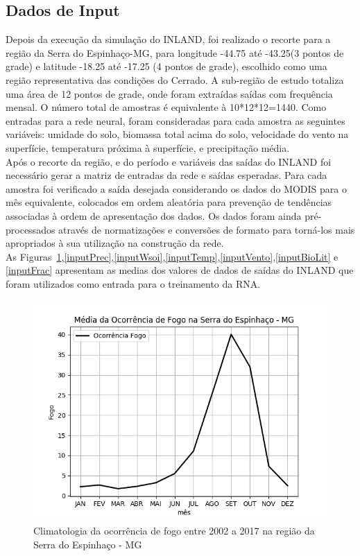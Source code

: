 \documentclass[conference]{IEEEtran}
\begin{document}
\subsection{Dados de Input}
Depois da execução da simulação do INLAND, foi realizado o recorte para a região da Serra do Espinhaço-MG, para longitude -44.75 até -43.25(3 pontos de grade) e latitude -18.25 até -17.25 (4 pontos de grade), escolhido como uma região representativa das condições do Cerrado. A sub-região de estudo totaliza uma área de 12 pontos de grade, onde foram extraídas saídas com frequência mensal. O número total de amostras é equivalente à 10*12*12=1440. Como entradas para a rede neural, foram consideradas para cada amostra as seguintes variáveis: umidade do solo, biomassa total acima do solo, velocidade do vento na superfície, temperatura próxima à superfície, e precipitação média.\\ 
Após o recorte da região, e do período e variáveis das saídas do INLAND foi necessário gerar a matriz de entradas da rede e saídas esperadas. Para cada amostra foi verificado a saída desejada considerando os dados do MODIS para o mês equivalente, colocados em ordem aleatória para prevenção de tendências associadas à ordem de apresentação dos dados. Os dados foram ainda pré-processados através de normatizações e conversões de formato para torná-los mais apropriados à sua utilização na construção da rede.\\ 
As Figuras~\ref{inputFogo},\ref{inputPrec},\ref{inputWsoi},\ref{inputTemp},\ref{inputVento},\ref{inputBioLit} e \ref{inputFrac} apresentam as medias dos valores de dados de saídas do INLAND que foram utilizados como entrada para o treinamento da RNA.\\


\begin{figure}[htbp]
\centerline{\includegraphics[width=0.4\paperwidth]{figuras/fogo.png}}
\caption{Climatologia da ocorrência de fogo entre 2002 a 2017 na região da Serra do Espinhaço - MG}
\label{inputFogo}
\end{figure}
\end{document}
